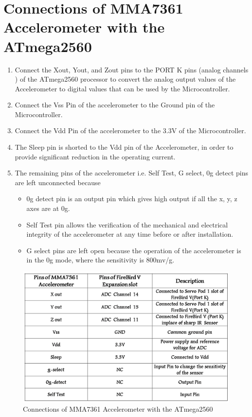 \documentclass[a4paper,12 pt]{article}
\begin{document}
\pagebreak
\section{Connections of MMA7361 Accelerometer with the ATmega2560}
\vspace {5 mm}
\begin{enumerate}

\item Connect the Xout, Yout, and Zout pins to the PORT K pins (analog channels ) of the ATmega2560 processor to convert the analog output values of the Accelerometer to digital values that can be used by the Microcontroller.
\item Connect the Vss Pin of the accelerometer to the Ground pin of the Microcontroller.
\item Connect the Vdd Pin of the accelerometer to the 3.3V of the Microcontroller.
\item The Sleep pin is shorted to the Vdd pin of the Accelerometer, in order to provide significant reduction in the operating current.
\item The remaining pins of the accelerometer i.e. Self Test, G select, 0g detect pins are left unconnected because
\begin{itemize}

\item  0g detect pin is an output pin which gives high output if all the x, y, z axes are at 0g.
\item Self Test pin allows the verification of the mechanical and electrical integrity of the accelerometer at any time before or after installation.
\item G select pins are left open because the operation of the accelerometer is in the 0g mode, where the sensitivity is 800mv/g.
\end{itemize}
\end{enumerate}

\begin{figure}[!h]
\begin{center}
\includegraphics[]{Picture1.png}
\caption{Connections of MMA7361 Accelerometer with the ATmega2560}

\end{center}
\end{figure}
\pagebreak
\end{document}
